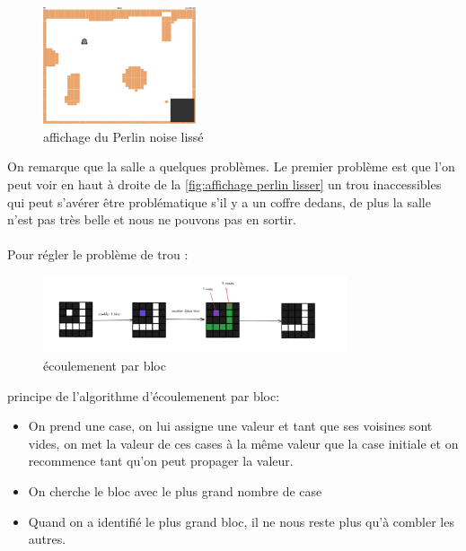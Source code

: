 \documentclass[a4paper,11pt]{article}
\begin{document}
\begin{figure}[h]
\centering
\includegraphics[width=0.4\textwidth]{./img/perlinLisser.png}
\caption{affichage du Perlin noise lissé}
\label{fig:affichage perlin lisser}
\end{figure}
\bigskip
On remarque que la salle a quelques problèmes. Le premier problème est que l'on peut voir en haut à droite de la \autoref{fig:affichage perlin lisser} un trou inaccessibles qui peut s'avérer être problématique s'il y a un coffre dedans, de plus la salle n'est pas très belle et nous ne pouvons pas en sortir.
\\\\

 Pour régler le problème de trou : 
 \begin{figure}[h]
    \centering
    \includegraphics[width=0.8\textwidth]{./img/ecoulementBloc.png}
    \caption{écoulemenent par bloc}
    \label{fig:exemple ecoulement}
\end{figure}

principe de l'algorithme d'écoulemenent par bloc: 
\begin{itemize}
    \item On prend une case, on lui assigne une valeur et tant que ses voisines sont vides, on met la valeur de ces cases à la même valeur que la case initiale et on recommence tant qu'on peut propager la valeur.
    \item On cherche le bloc avec le plus grand nombre de case
    \item Quand on a identifié le plus grand bloc, il ne nous reste plus qu'à combler les autres.
\end{itemize}
\bigskip




\bigskip
\end{document}
